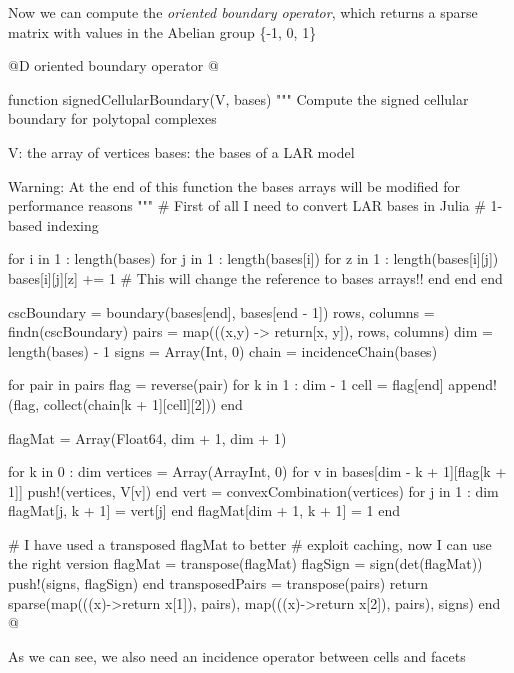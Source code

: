 \documentclass[11pt,oneside]{article}	%
\begin{document}
Now we can compute the \textit{oriented boundary operator}, which returns a sparse matrix with values in the Abelian group \{-1, 0, 1\}

@D oriented boundary operator
@{function signedCellularBoundary(V, bases)
  """
  Compute the signed cellular boundary
  for polytopal complexes

  V: the array of vertices
  bases: the bases of a LAR model
  
  Warning: At the end of this function the bases arrays
  will be modified for performance reasons
  """
  # First of all I need to convert LAR bases in Julia
  # 1-based indexing

  for i in 1 : length(bases)
    for j in 1 : length(bases[i])
      for z in 1 : length(bases[i][j])
        bases[i][j][z] += 1 # This will change the reference to bases arrays!!
      end
    end
  end

  cscBoundary = boundary(bases[end], bases[end - 1])
  rows, columns = findn(cscBoundary)
  pairs = map(((x,y) -> return[x, y]), rows, columns)
  dim = length(bases) - 1
  signs = Array(Int, 0)
  chain = incidenceChain(bases)

  for pair in pairs
    flag = reverse(pair)
    for k in 1 : dim - 1
      cell = flag[end]
      append!(flag, collect(chain[k + 1][cell][2]))
    end
    
    flagMat = Array(Float64, dim + 1, dim + 1)
    
    for k in 0 : dim
      vertices = Array(Array{Int}, 0)
      for v in bases[dim - k + 1][flag[k + 1]]
        push!(vertices, V[v])
      end
      vert = convexCombination(vertices)
      for j in 1 : dim
        flagMat[j, k + 1] = vert[j]
      end
      flagMat[dim + 1, k + 1] = 1
    end
    
    # I have used a transposed flagMat to better
    # exploit caching, now I can use the right version
    flagMat = transpose(flagMat)
    flagSign = sign(det(flagMat))
    push!(signs, flagSign)
  end
  transposedPairs = transpose(pairs)
  return sparse(map(((x)->return x[1]), pairs), map(((x)->return x[2]), pairs), signs)
end @}

As we can see, we also need an incidence operator between cells and facets
\end{document}

